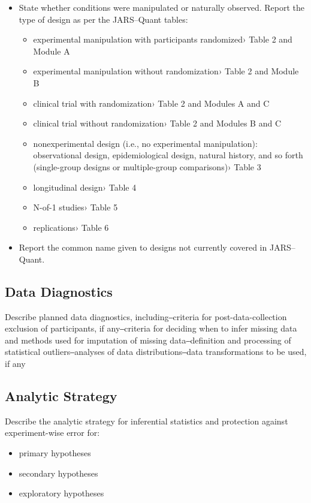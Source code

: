 \documentclass[acmsmall]{acmart}
\begin{document}
\begin{itemize}
    \item State whether conditions were manipulated or naturally observed. Report the type of design as per the JARS–Quant tables:
    \begin{itemize}
        \item experimental manipulation with participants randomized›   Table 2 and Module A
        \item experimental manipulation without randomization›   Table 2 and Module B
        \item clinical trial with randomization›   Table 2 and Modules A and C
        \item clinical trial without randomization›   Table 2 and Modules B and C
        \item nonexperimental design (i.e., no experimental manipulation): observational design, epidemiological design, natural history, and so forth (single-group designs or multiple-group comparisons)›   Table 3
        \item longitudinal design›   Table 4
        \item N-of-1 studies›   Table 5
        \item replications›   Table 6
    \end{itemize}

    \item Report the common name given to designs not currently covered in JARS–Quant.
\end{itemize}

\subsection{Data Diagnostics}

Describe planned data diagnostics, including‒criteria for post-data-collection exclusion of participants, if any‒criteria for deciding when to infer missing data and methods used for imputation of missing data‒definition and processing of statistical outliers‒analyses of data distributions‒data transformations to be used, if any

\subsection{Analytic Strategy}

Describe the analytic strategy for inferential statistics and protection against experiment-wise error for:
\begin{itemize}
    \item primary hypotheses
    \item secondary hypotheses
    \item exploratory hypotheses
\end{itemize}
\end{document}
